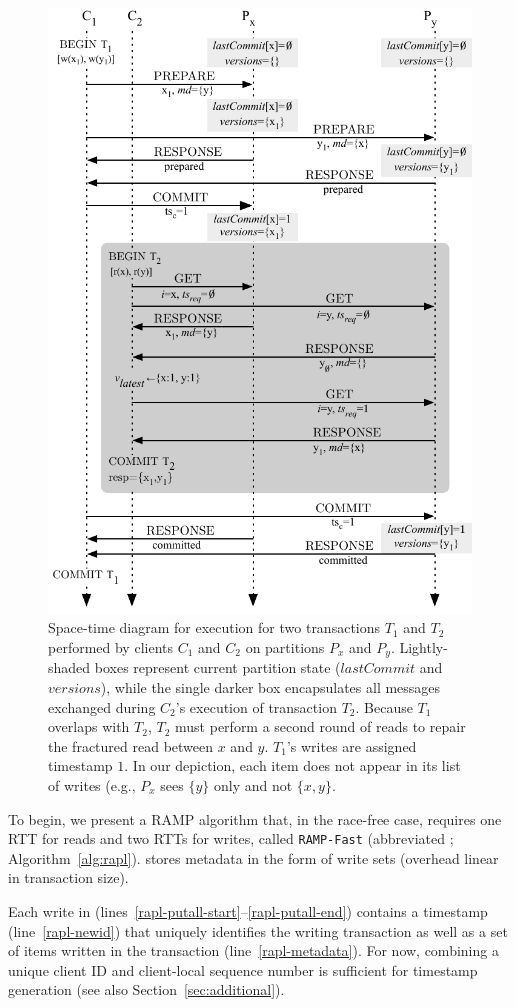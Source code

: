\begin{figure}[t!]
\begin{center}
\includegraphics[width=.6\columnwidth]{diagram/rapl-big.pdf}\vspace{.5em}
\caption{Space-time diagram for \rapl execution for two transactions
  $T_1$ and $T_2$ performed by clients $C_1$ and $C_2$ on partitions
  $P_x$ and $P_y$. Lightly-shaded boxes represent current partition
  state ($lastCommit$ and $versions$), while the single darker box
  encapsulates all messages exchanged during $C_2$'s execution of
  transaction $T_2$.  Because $T_1$ overlaps with $T_2$, $T_2$ must
  perform a second round of reads to repair the fractured read between
  $x$ and $y$. $T_1$'s writes are assigned timestamp $1$. In our
  depiction, each item does not appear in its list of writes (e.g.,
  $P_x$ sees $\{y\}$ only and not $\{x,y\}$.}
\label{fig:rapl-execution}
\end{center}
\end{figure}

To begin, we present a RAMP algorithm that, in the race-free case,
requires one RTT for reads and two RTTs for writes, called
\texttt{RAMP-Fast} (abbreviated \rapl; Algorithm~\ref{alg:rapl}).
\rapl stores metadata in the form of write sets (overhead linear in
transaction size).

 Each write in \rapl
(lines~\ref{rapl-putall-start}--\ref{rapl-putall-end}) contains a
timestamp (line~\ref{rapl-newid}) that uniquely identifies the writing
transaction as well as a set of items written in the transaction
(line~\ref{rapl-metadata}). For now, combining a unique client ID and
client-local sequence number is sufficient for timestamp generation
(see also Section~\ref{sec:additional}).

